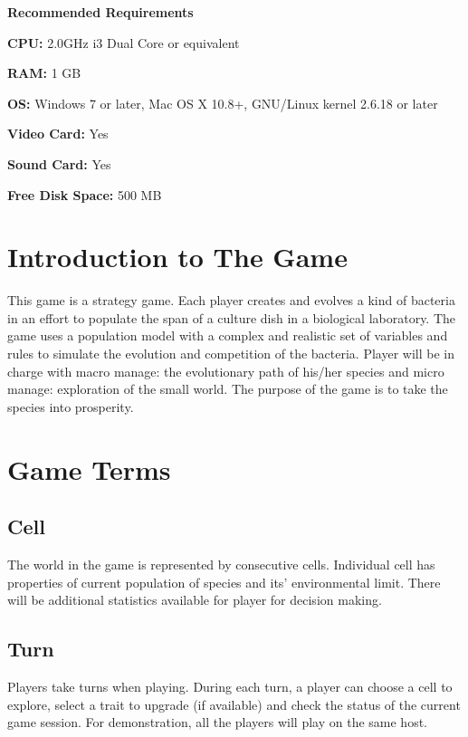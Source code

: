\documentclass[12pt,a4paper,twoside]{scrartcl}
\begin{document}
\large
\textbf{Recommended Requirements}
\begin{list}{}{}
	\item \textbf{CPU:} 2.0GHz i3 Dual Core or equivalent
	\item \textbf{RAM:} 1 GB
	\item \textbf{OS:} Windows 7 or later, Mac OS X 10.8+, GNU/Linux kernel 2.6.18 or later
	\item \textbf{Video Card:} Yes
	\item \textbf{Sound Card:} Yes
	\item \textbf{Free Disk Space:} 500 MB
\end{list}
\clearpage
\tableofcontents
\clearpage

\section{Introduction to The Game}

This game is a strategy game. Each player creates and evolves a kind of bacteria in an effort to populate the span of a culture dish in a biological laboratory. The game uses a population model with a complex and realistic set of variables and rules to simulate the evolution and competition of the bacteria. Player will be in charge with macro manage: the evolutionary path of his/her species and micro manage: exploration of the small world. The purpose of the game is to take the species into prosperity.

\section{Game Terms}

\subsection{Cell}

The world in the game is represented by consecutive cells. Individual cell has properties of current population of species and its' environmental limit. There will be additional statistics available for player for decision making.

\subsection{Turn}

Players take turns when playing. During each turn, a player can choose a cell to explore, select a trait to upgrade (if available) and check the status of the current game session. For demonstration, all the players will play on the same host.
\end{document}
